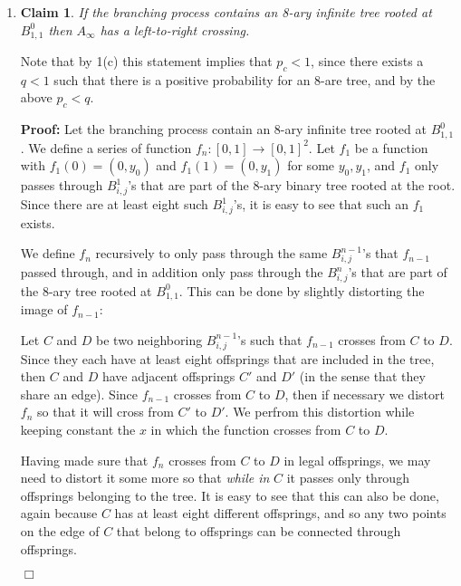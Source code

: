 \documentclass[11pt]{article} \usepackage{amssymb}
\newtheorem{claim}[theorem]{Claim}
\newenvironment{proof}{\noindent \textbf{Proof:}}{$\Box$}
\begin{document}
\begin{enumerate}
\begin{enumerate}
    \item
      \begin{claim}
        If the branching process contains an 8-ary infinite tree rooted
        at $B_{1,1}^0$ then $A_\infty$ has a left-to-right crossing.
      \end{claim}
      Note that by 1(c) this statement implies that $p_c<1$, since there exists
      a $q<1$ such that there is a positive probability for an 8-are tree,
      and by the above $p_c<q$.

      \begin{proof}
        Let the branching process contain an 8-ary infinite tree rooted at 
        $B_{1,1}^0$. We define a series of function $f_n:[0,1]\to[0,1]^2$.
        Let $f_1$ be a function with $f_1(0)=(0,y_0)$ and 
        $f_1(1)=(0,y_1)$ for some $y_0,y_1$, and $f_1$ only passes through
        $B_{i,j}^1$'s that are part of the 8-ary binary tree rooted at the root.
        Since there are at least eight such $B_{i,j}^1$'s, it is easy to see 
        that such an $f_1$ exists.

        We define $f_n$ recursively to only pass through the same $B_{i,j}^{n-1}$'s
        that $f_{n-1}$ passed through, and in addition only pass through
        the $B_{i,j}^n$'s that are
        part of the 8-ary tree rooted at $B_{1,1}^0$. This can be done by slightly 
        distorting the image of $f_{n-1}$:

        Let $C$ and $D$ be
        two neighboring 
        $B_{i,j}^{n-1}$'s such that $f_{n-1}$ crosses from $C$ to $D$. Since they each have at 
        least eight offsprings that are included in the tree, then $C$ and $D$
        have adjacent offsprings $C'$ and $D'$ (in the sense that they share an 
        edge).
        Since $f_{n-1}$ crosses from $C$ to $D$, then if necessary we distort $f_n$ so 
        that it will cross from
        $C'$ to $D'$. We perfrom this distortion while keeping constant the $x$
        in which the function crosses from $C$ to $D$.
        
        Having made sure that $f_n$ crosses from $C$ to $D$ in legal offsprings,
        we may need to distort it some more so that {\em while in} $C$ it 
        passes only
        through offsprings belonging to the tree. It is easy to see that this
        can also be done, again because $C$ has at least eight different 
        offsprings, and so any two points on the edge of $C$ that belong to
        offsprings can be connected through offsprings.


\end{proof}
\end{enumerate}
\end{enumerate}
\end{document}
